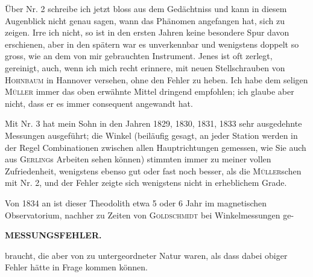 \par\noindent\hspace*{\parindent}Über Nr. 2 schreibe ich jetzt bloss aus dem Gedächtniss und kann in diesem Augenblick nicht genau sagen, wann das Phänomen angefangen hat, sich zu zeigen. Irre ich nicht, so ist in den ersten Jahren keine besondere Spur davon erschienen, aber in den spätern war es unverkennbar und wenigstens doppelt so gross, wie an dem von mir gebrauchten Instrument. Jenes ist oft zerlegt, gereinigt, auch, wenn ich mich recht erinnere, mit neuen Stellschrauben von \textsc{Hohnbaum} in Hannover versehen, ohne den Fehler zu heben. Ich habe dem seligen \textsc{Müller} immer das oben erwähnte Mittel dringend empfohlen; ich glaube aber nicht, dass er es immer consequent angewandt hat.

\par\noindent\hspace*{\parindent}Mit Nr. 3 hat mein Sohn in den Jahren 1829, 1830, 1831, 1833 sehr ausgedehnte Messungen ausgeführt; die Winkel (beiläufig gesagt, an jeder Station werden in der Regel  Combinationen zwischen allen Hauptrichtungen gemessen, wie Sie auch aus \textsc{Gerling}s Arbeiten sehen können) stimmten immer zu meiner vollen Zufriedenheit, wenigstens ebenso gut oder fast noch besser, als die \textsc{Müller}schen mit Nr. 2, und der Fehler zeigte sich wenigstens nicht in erheblichem Grade.

\par\noindent\hspace*{\parindent}Von 1834 an ist dieser Theodolith etwa 5 oder 6 Jahr im magnetischen Observatorium, nachher zu Zeiten von \textsc{Goldschmidt} bei Winkelmessungen ge-

\par\clearpage
\noindent\null\hfill{\small\textbf{MESSUNGSFEHLER.}}\hfill{}\par\medskip
\noindent braucht, die aber von zu untergeordneter Natur waren, als dass dabei obiger Fehler hätte in Frage kommen können.

